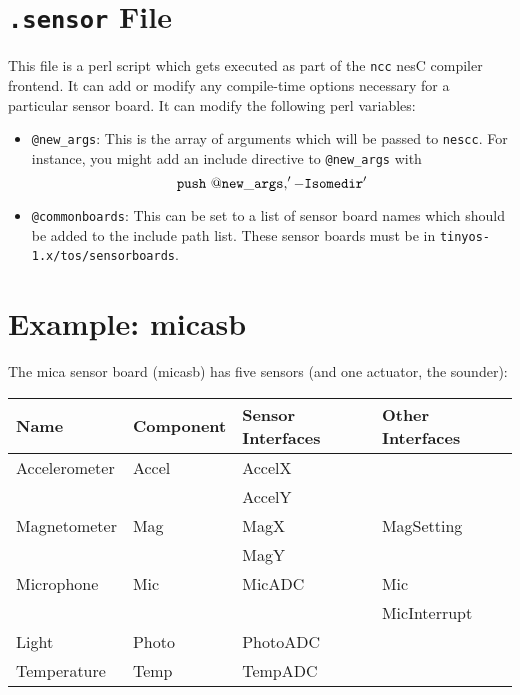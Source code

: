 \documentclass{article}
\newcommand{\fname}[1]{{\tt #1}}
\newcommand{\code}[1]{{\tt #1}}
\begin{document}
\section{\fname{.sensor} File}

This file is a perl script which gets executed as part of the \fname{ncc}
nesC compiler frontend. It can add or modify any compile-time options 
necessary for a particular sensor board. It can modify the following perl
variables:
\begin{itemize}
\item \code{@new\_args}: This is the array of arguments which will be
passed to \code{nescc}. For instance, you might add an include directive
to \code{@new\_args} with \[ \code{push\ @new\_args, '-Isomedir'} \]
\item \code{@commonboards}: This can be set to a list of sensor board names
which should be added to the include path list. These sensor boards must be
in \code{tinyos-1.x/tos/sensorboards}.
\end{itemize}

\section{Example: micasb}

The mica sensor board (micasb) has five sensors (and one actuator, the
sounder):

\vspace{0.2in}
\begin{tabular}{|l|l|l|l|}\hline
Name          & Component & Sensor Interfaces & Other Interfaces\\ \hline \hline
Accelerometer & Accel     & AccelX         & \\
              &           & AccelY         & \\ \hline
Magnetometer  & Mag       & MagX           & MagSetting\\
              &           & MagY           &  \\ \hline
Microphone    & Mic       & MicADC         & Mic \\
              &           &                & MicInterrupt \\ \hline
Light         & Photo     & PhotoADC       & \\ \hline
Temperature   & Temp      & TempADC        &\\ \hline
\end{tabular}
\vspace{0.2in}
\end{document}
